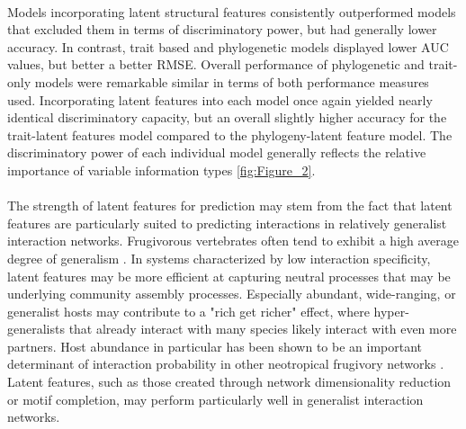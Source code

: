 \paragraph*{}
Models incorporating latent structural features consistently outperformed models that excluded them in terms of discriminatory power, but had generally lower accuracy. In contrast, trait based and phylogenetic models displayed lower AUC values, but better a better RMSE. Overall performance of phylogenetic and trait-only models were remarkable similar in terms of both performance measures used. Incorporating latent features into each model once again yielded nearly identical discriminatory  capacity, but an overall slightly higher accuracy for the trait-latent features model compared to the phylogeny-latent feature model. The discriminatory power of each individual model generally reflects the relative importance of variable information types \ref{fig:Figure_2}. 

\paragraph*{}
The strength of latent features for prediction may stem from the fact that latent features are particularly suited to predicting interactions in relatively generalist interaction networks. Frugivorous vertebrates often tend to exhibit a high average degree of generalism \cite{richardson2000plant}. In systems characterized by low interaction specificity, latent features may be more efficient at capturing neutral processes that may be underlying community assembly processes. Especially abundant, wide-ranging, or generalist hosts may contribute to a "rich get richer" effect, where hyper-generalists that already interact with many species likely interact with even more partners. Host abundance in particular has been shown to be an important determinant of interaction probability in other neotropical frugivory networks \cite{laurindo2020drivers}. Latent features, such as those created through network dimensionality reduction or motif completion, may perform particularly well in generalist interaction networks. 

